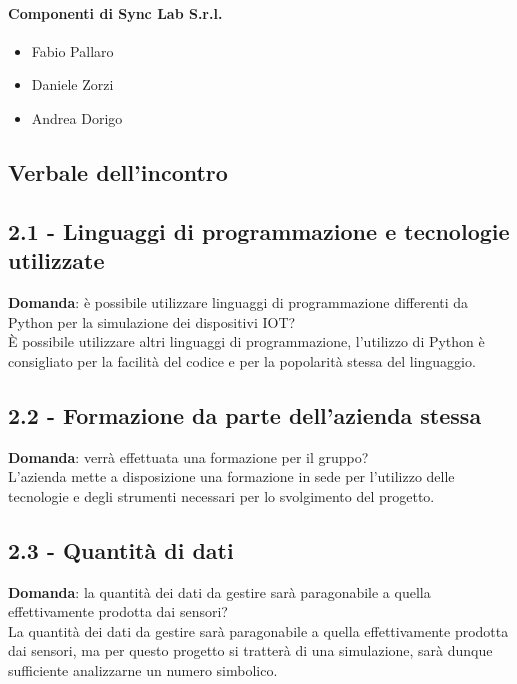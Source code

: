 \documentclass[italian,12pt]{article} %
\begin{document}
\paragraph{Componenti di Sync Lab S.r.l.}

\begin{itemize}
	\item Fabio Pallaro
	\item Daniele Zorzi
	\item Andrea Dorigo
\end{itemize}

\newpage

\begin{flushleft}
\section{Verbale dell'incontro}
\subsection*{2.1 - Linguaggi di programmazione e tecnologie utilizzate}
	\textbf{Domanda}: è possibile utilizzare linguaggi di programmazione differenti da Python per la simulazione dei dispositivi IOT?\\
	È possibile utilizzare altri linguaggi di programmazione, l'utilizzo di Python è consigliato per la facilità del codice e per la popolarità stessa del linguaggio.


\subsection*{2.2 - Formazione da parte dell'azienda stessa}

	\textbf{Domanda}: verrà effettuata una formazione per il gruppo?\\
	L'azienda mette a disposizione una formazione in sede per l'utilizzo delle tecnologie e degli strumenti necessari per lo svolgimento del progetto.

\subsection*{2.3 - Quantità di dati}
	\textbf{Domanda}: la quantità dei dati da gestire sarà paragonabile a quella effettivamente prodotta dai sensori?\\
	La quantità dei dati da gestire sarà paragonabile a quella effettivamente prodotta dai sensori, ma per questo progetto si tratterà di una simulazione, sarà dunque sufficiente analizzarne un numero simbolico.


\end{flushleft}
\end{document}
